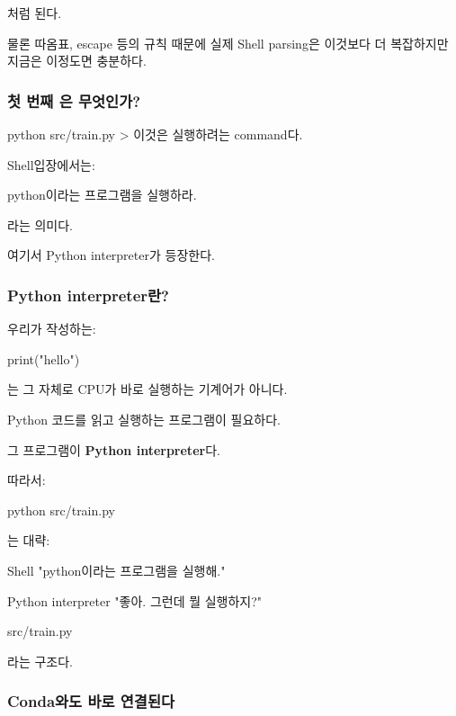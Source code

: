 처럼 된다.

물론 따옴표, escape 등의 규칙 때문에 실제 Shell parsing은 이것보다 더 복잡하지만 지금은 이정도면 충분하다.

\subsubsection{첫 번째 은 무엇인가?}

\begin{dhkdir}
python src/train.py
> 이것은 실행하려는 command다.
\end{dhkdir}

Shell입장에서는:

\begin{dhksmry}[centered]
python이라는 프로그램을 실행하라.
\end{dhksmry}

라는 의미다.

여기서 Python interpreter가 등장한다.

\subsubsection{Python interpreter란?}

우리가 작성하는:

\begin{dhkcode}
print("hello")
\end{dhkcode}

는 그 자체로 CPU가 바로 실행하는 기계어가 아니다.

Python 코드를 읽고 실행하는 프로그램이 필요하다.

그 프로그램이 \textbf{Python interpreter}다.

따라서:

\begin{dhkzsh}
python src/train.py
\end{dhkzsh}

는 대략:

\begin{dhksmry}[centered]
Shell
"python이라는 프로그램을 실행해."

\da

Python interpreter
"좋아. 그런데 뭘 실행하지?"

\da

src/train.py
\end{dhksmry}

라는 구조다.

\subsubsection{Conda와도 바로 연결된다}

